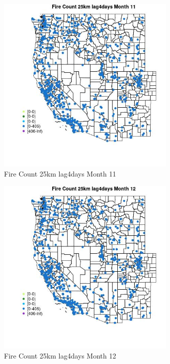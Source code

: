 \begin{figure} 
\centering  
\includegraphics[width=0.77\textwidth]{Code_Outputs/Report_ML_input_PM25_Step4_part_f_de_duplicated_aves_prioritize_24hr_obswNAs_MapObsMo11Fire_Count_25km_lag4days.jpg} 
\caption{\label{fig:Report_ML_input_PM25_Step4_part_f_de_duplicated_aves_prioritize_24hr_obswNAsMapObsMo11Fire_Count_25km_lag4days}Fire Count 25km lag4days Month 11} 
\end{figure} 
 

\begin{figure} 
\centering  
\includegraphics[width=0.77\textwidth]{Code_Outputs/Report_ML_input_PM25_Step4_part_f_de_duplicated_aves_prioritize_24hr_obswNAs_MapObsMo12Fire_Count_25km_lag4days.jpg} 
\caption{\label{fig:Report_ML_input_PM25_Step4_part_f_de_duplicated_aves_prioritize_24hr_obswNAsMapObsMo12Fire_Count_25km_lag4days}Fire Count 25km lag4days Month 12} 
\end{figure} 
 

